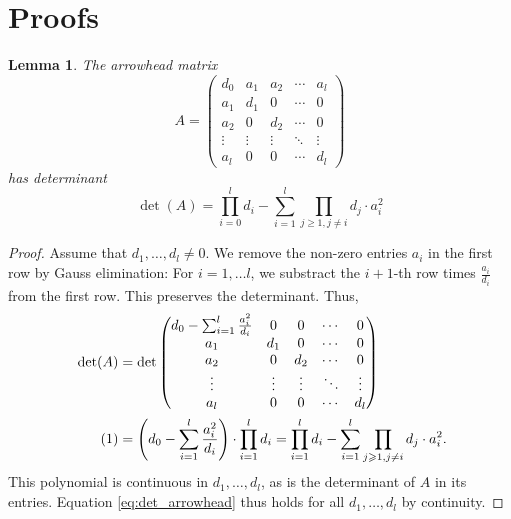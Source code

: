 \documentclass[11pt,hidelinks,a4paper]{article}
\newtheorem{lemma}[theorem]{Lemma}
\let\geq\geqslant
\newcommand\numberthis{\addtocounter{equation}{1}\tag{\theequation}}
\begin{document}
\appendix
\section{Proofs}

\begin{lemma}
    \label{lem:1}
    The arrowhead matrix
    $$
    A =
    \begin{pmatrix}
        d_0 & a_1 & a_2 & \cdots & a_l \\
        a_1 & d_1 & 0 & \cdots & 0 \\
        a_2 & 0 & d_2 & \cdots & 0 \\
        \vdots & \vdots & \vdots & \ddots & \vdots \\
        a_l & 0 & 0 & \cdots & d_l
    \end{pmatrix}
    $$
    has determinant
    $$
    \det(A) = \prod_{i = 0}^l d_i - \sum_{i = 1}^l \prod_{j \geq 1, j \neq i} d_j \cdot a_i^2
    $$
\end{lemma}
\begin{proof}
Assume that $d_1, \ldots, d_l \neq 0$.
We remove the non-zero entries $a_i$ in the first row by Gauss elimination: For $i = 1, \ldots l$, we substract the $i+1$-th row times $\frac{a_i}{d_i}$ from the first row.
This preserves the determinant.
Thus,
\begin{align*}
\det(A) &= \det \begin{pmatrix}
    d_0 - \sum_{i = 1}^l \frac{a_i^2}{d_i} & 0 & 0 & \cdots & 0 \\
    a_1 & d_1 & 0 & \cdots & 0 \\
    a_2 & 0 & d_2 & \cdots & 0 \\
    \vdots & \vdots & \vdots & \ddots & \vdots \\
    a_l & 0 & 0 & \cdots & d_l
\end{pmatrix} \\
\numberthis
\label{eq:det_arrowhead}
&= \left( d_0 - \sum_{i = 1}^l \frac{a_i^2}{d_i} \right) \cdot \prod_{i = 1}^l d_i = \prod_{i = 1}^l d_i - \sum_{i = 1}^l \prod_{j \geq 1, j \neq i} d_j \cdot a_i^2.
\end{align*}
This polynomial is continuous in $d_1, \ldots, d_l$, as is the determinant of $A$ in its entries.
Equation \eqref{eq:det_arrowhead} thus holds for all $d_1, \ldots, d_l$ by continuity.
\end{proof}

\printProofs
\end{document}
